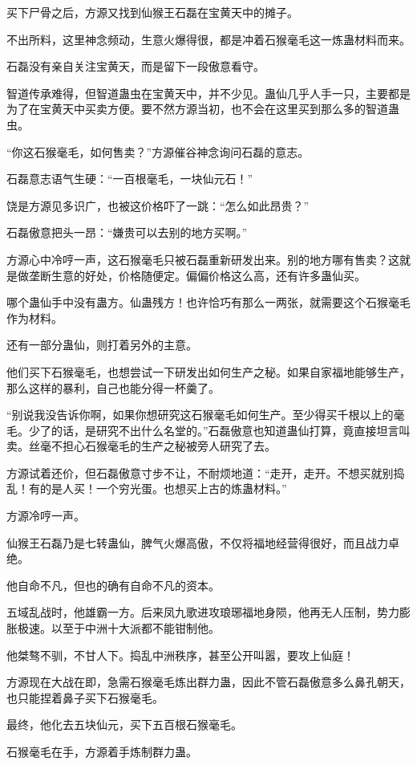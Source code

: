 \begin{this_body}
买下尸骨之后，方源又找到仙猴王石磊在宝黄天中的摊子。

不出所料，这里神念频动，生意火爆得很，都是冲着石猴毫毛这一炼蛊材料而来。

石磊没有亲自关注宝黄天，而是留下一段傲意看守。

智道传承难得，但智道蛊虫在宝黄天中，并不少见。蛊仙几乎人手一只，主要都是为了在宝黄天中买卖方便。要不然方源当初，也不会在这里买到那么多的智道蛊虫。

“你这石猴毫毛，如何售卖？”方源催谷神念询问石磊的意志。

石磊意志语气生硬：“一百根毫毛，一块仙元石！”

饶是方源见多识广，也被这价格吓了一跳：“怎么如此昂贵？”

石磊傲意把头一昂：“嫌贵可以去别的地方买啊。”

方源心中冷哼一声，这石猴毫毛只被石磊重新研发出来。别的地方哪有售卖？这就是做垄断生意的好处，价格随便定。偏偏价格这么高，还有许多蛊仙买。

哪个蛊仙手中没有蛊方。仙蛊残方！也许恰巧有那么一两张，就需要这个石猴毫毛作为材料。

还有一部分蛊仙，则打着另外的主意。

他们买下石猴毫毛，也想尝试一下研发出如何生产之秘。如果自家福地能够生产，那么这样的暴利，自己也能分得一杯羹了。

“别说我没告诉你啊，如果你想研究这石猴毫毛如何生产。至少得买千根以上的毫毛。少了的话，是研究不出什么名堂的。”石磊傲意也知道蛊仙打算，竟直接坦言叫卖。丝毫不担心石猴毫毛的生产之秘被旁人研究了去。

方源试着还价，但石磊傲意寸步不让，不耐烦地道：“走开，走开。不想买就别捣乱！有的是人买！一个穷光蛋。也想买上古的炼蛊材料。”

方源冷哼一声。

仙猴王石磊乃是七转蛊仙，脾气火爆高傲，不仅将福地经营得很好，而且战力卓绝。

他自命不凡，但也的确有自命不凡的资本。

五域乱战时，他雄霸一方。后来凤九歌进攻琅琊福地身陨，他再无人压制，势力膨胀极速。以至于中洲十大派都不能钳制他。

他桀骜不驯，不甘人下。捣乱中洲秩序，甚至公开叫嚣，要攻上仙庭！

方源现在大战在即，急需石猴毫毛炼出群力蛊，因此不管石磊傲意多么鼻孔朝天，也只能捏着鼻子买下石猴毫毛。

最终，他化去五块仙元，买下五百根石猴毫毛。

石猴毫毛在手，方源着手炼制群力蛊。


\end{this_body}
